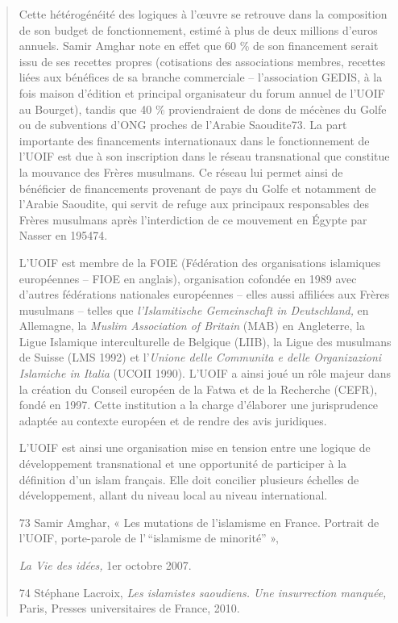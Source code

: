 \begin{quote}
Cette hétérogénéité des logiques à l'œuvre se retrouve dans la
composition de son budget de fonctionnement, estimé à plus de deux
millions d'euros annuels. Samir Amghar note en effet que 60 \% de son
financement serait issu de ses recettes propres (cotisations des
associations membres, recettes liées aux bénéfices de sa branche
commerciale -- l'association GEDIS, à la fois maison d'édition et
principal organisateur du forum annuel de l'UOIF au Bourget), tandis que
40 \% proviendraient de dons de mécènes du Golfe ou de subventions d'ONG
proches de l'Arabie Saoudite73. La part importante des financements
internationaux dans le fonctionnement de l'UOIF est due à son
inscription dans le réseau transnational que constitue la mouvance des
Frères musulmans. Ce réseau lui permet ainsi de bénéficier de
financements provenant de pays du Golfe et notamment de l'Arabie
Saoudite, qui servit de refuge aux principaux responsables des Frères
musulmans après l'interdiction de ce mouvement en Égypte par Nasser en
195474.

L'UOIF est membre de la FOIE (Fédération des organisations islamiques
européennes -- FIOE en anglais), organisation cofondée en 1989 avec
d'autres fédérations nationales européennes -- elles aussi affiliées aux
Frères musulmans -- telles que \emph{l'Islamitische Gemeinschaft in
Deutschland,} en Allemagne, la \emph{Muslim Association of Britain}
(MAB) en Angleterre, la Ligue Islamique interculturelle de Belgique
(LIIB), la Ligue des musulmans de Suisse (LMS 1992) et l'\emph{Unione
delle Communita e delle Organizazioni Islamiche in Italia} (UCOII 1990).
L'UOIF a ainsi joué un rôle majeur dans la création du Conseil européen
de la Fatwa et de la Recherche (CEFR), fondé en 1997. Cette institution
a la charge d'élaborer une jurisprudence adaptée au contexte européen et
de rendre des avis juridiques.

L'UOIF est ainsi une organisation mise en tension entre une logique de
développement transnational et une opportunité de participer à la
définition d'un islam français. Elle doit concilier plusieurs échelles
de développement, allant du niveau local au niveau international.

73 Samir Amghar, « Les mutations de l'islamisme en France. Portrait de
l'UOIF, porte-parole de l'\,``islamisme de minorité'' »,

\emph{La Vie des idées,} 1er octobre 2007.

74 Stéphane Lacroix, \emph{Les islamistes saoudiens. Une insurrection
manquée,} Paris, Presses universitaires de France, 2010.


\end{quote}
